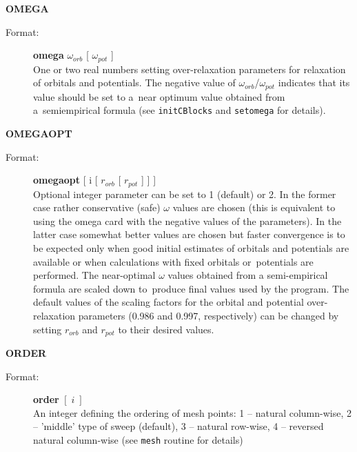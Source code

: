 \documentclass[12pt,a4paper]{article}
\newcommand{\ft}[1]{\texttt{#1}}
\begin{document}
\begin{description}
\item \textbf{OMEGA}
\begin{description}
\item[Format:] \textbf{omega} $\omega_{orb}$ [ $\omega_{pot}$ ] \\ One or two real numbers
  setting over-relaxation parameters for relaxation of orbitals and potentials. The
  negative value of $\omega_{orb}$/$\omega_{pot}$ indicates that its value should be
  set to a~near optimum value obtained from a~semiempirical formula (see \ft{initCBlocks}
  and \ft{setomega} for details).
\end{description}

\newpage

\item \textbf{OMEGAOPT}
\begin{description}
\item[Format:] \textbf{omegaopt} [ i [ $r_{orb}$ [ $r_{pot}$ ] ] ] \\ Optional integer
  parameter can be set to 1 (default) or 2. In the former case rather conservative (safe)
  $\omega$ values are chosen (this is equivalent to using the omega card with the negative
  values of the parameters). In the latter case somewhat better values are chosen but
  faster convergence is to be expected only when good initial estimates of orbitals and
  potentials are available or when calculations with fixed orbitals or~potentials are
  performed. The near-optimal $\omega$ values obtained from a semi-empirical formula are
  scaled down to~produce final values used by the program. The default values of the
  scaling factors for the orbital and potential over-relaxation parameters (0.986 and
  0.997, respectively) can be changed by setting $r_{orb}$ and $r_{pot}$ to their desired
  values.
\end{description}

\item \textbf{ORDER}
\begin{description}
\item[Format:] \textbf{order} $[\;i\;]$\\ An integer defining the ordering of mesh points:
  1 -- natural column-wise, 2 -- 'middle' type of sweep (default), 3 -- natural
  row-wise, 4 -- reversed natural column-wise (see \ft{mesh} routine for details)
\end{description}




\end{description}
\end{document}
